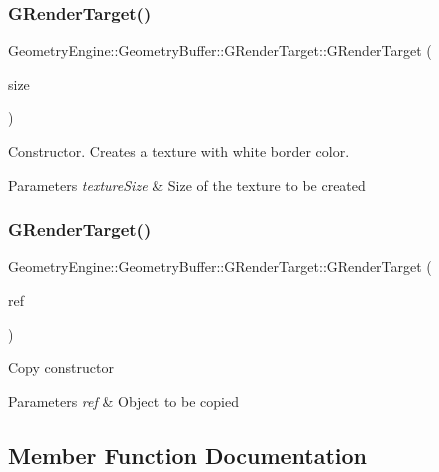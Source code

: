 \subsubsection{\texorpdfstring{GRenderTarget()}{GRenderTarget()}\hspace{0.1cm}{\footnotesize\ttfamily [1/2]}}
{\footnotesize\ttfamily Geometry\+Engine\+::\+Geometry\+Buffer\+::\+G\+Render\+Target\+::\+G\+Render\+Target (\begin{DoxyParamCaption}\item[{const Q\+Vector2D \&}]{size }\end{DoxyParamCaption})}

Constructor. Creates a texture with white border color. 
\begin{DoxyParams}{Parameters}
{\em texture\+Size} & Size of the texture to be created \\
\hline
\end{DoxyParams}
\mbox{\label{class_geometry_engine_1_1_geometry_buffer_1_1_g_render_target_a26d555dc583ad6ae0c545f26db97274d}} 
\subsubsection{\texorpdfstring{GRenderTarget()}{GRenderTarget()}\hspace{0.1cm}{\footnotesize\ttfamily [2/2]}}
{\footnotesize\ttfamily Geometry\+Engine\+::\+Geometry\+Buffer\+::\+G\+Render\+Target\+::\+G\+Render\+Target (\begin{DoxyParamCaption}\item[{const \mbox{\hyperlink{class_geometry_engine_1_1_geometry_buffer_1_1_g_render_target}{G\+Render\+Target}} \&}]{ref }\end{DoxyParamCaption})}

Copy constructor 
\begin{DoxyParams}{Parameters}
{\em ref} & Object to be copied \\
\hline
\end{DoxyParams}


\subsection{Member Function Documentation}
\mbox{\label{class_geometry_engine_1_1_geometry_buffer_1_1_g_render_target_a3b14d8929cf9d2acb6bc263c709ff019}} 
